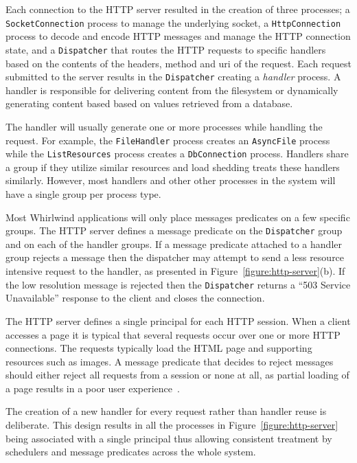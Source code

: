 \documentclass[conference,a4paper,final]{IEEEtran}
\begin{document}
Each connection to the HTTP server resulted in the creation of three processes; a \verb+SocketConnection+ process to manage the underlying socket, a \verb+HttpConnection+ process to decode and encode HTTP messages and manage the HTTP connection state, and a \verb+Dispatcher+ that routes the HTTP requests to specific handlers based on the contents of the headers, method and uri of the request. Each request submitted to the server results in the \verb+Dispatcher+ creating a \emph{handler} process. A handler is responsible for delivering content from the filesystem or dynamically generating content based based on values retrieved from a database. 

The handler will usually generate one or more processes while handling the request. For example, the \verb+FileHandler+ process creates an \verb+AsyncFile+ process while the \verb+ListResources+ process creates a \verb+DbConnection+ process. Handlers share a group if they utilize similar resources and load shedding treats these handlers similarly. However, most handlers and other other processes in the system will have a single group per process type.

Most Whirlwind applications will only place messages predicates on a few specific groups. The HTTP server defines a message predicate on the \verb+Dispatcher+ group and on each of the handler groups. If a message predicate attached to a handler group rejects a message then the dispatcher may attempt to send a less resource intensive request to the handler, as presented in Figure~\ref{figure:http-server}(b). If the low resolution message is rejected then the \verb+Dispatcher+ returns a ``503 Service Unavailable'' response to the client and closes the connection.

The HTTP server defines a single principal for each HTTP session. When a client accesses a page it is typical that several requests occur over one or more HTTP connections. The requests typically load the HTML page and supporting resources such as images. A message predicate that decides to reject messages should either reject all requests from a session or none at all, as partial loading of a page results in a poor user experience~\cite{Cherkasova:2002yb}. 

The creation of a new handler for every request rather than handler reuse is deliberate. This design results in all the processes in Figure~\ref{figure:http-server} being  associated with a single principal thus allowing consistent treatment by schedulers and message predicates across the whole system.
\end{document}
